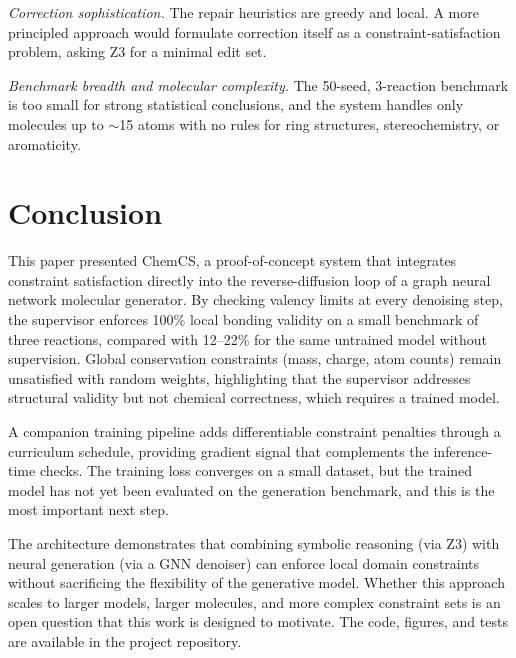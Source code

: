 \documentclass[11pt]{article}
\begin{document}
\emph{Correction sophistication.} The repair heuristics are greedy and
local. A more principled approach would formulate correction itself as
a constraint-satisfaction problem, asking Z3 for a minimal edit set.

\emph{Benchmark breadth and molecular complexity.} The 50-seed,
3-reaction benchmark is too small for strong statistical conclusions,
and the system handles only molecules up to $\sim$15 atoms with no
rules for ring structures, stereochemistry, or aromaticity.

\section{Conclusion}

This paper presented ChemCS, a proof-of-concept system that integrates
constraint satisfaction directly into the reverse-diffusion loop of a
graph neural network molecular generator. By checking valency limits at
every denoising step, the supervisor enforces 100\% local bonding
validity on a small benchmark of three reactions, compared with
12--22\% for the same untrained model without supervision. Global
conservation constraints (mass, charge, atom counts) remain unsatisfied
with random weights, highlighting that the supervisor addresses
structural validity but not chemical correctness, which requires a
trained model.

A companion training pipeline adds differentiable constraint penalties
through a curriculum schedule, providing gradient signal that
complements the inference-time checks. The training loss converges on a
small dataset, but the trained model has not yet been evaluated on the
generation benchmark, and this is the most important next step.

The architecture demonstrates that combining symbolic reasoning (via Z3)
with neural generation (via a GNN denoiser) can enforce local domain
constraints without sacrificing the flexibility of the generative model.
Whether this approach scales to larger models, larger molecules, and
more complex constraint sets is an open question that this work is
designed to motivate. The code, figures, and tests are available in the
project repository.
\end{document}

